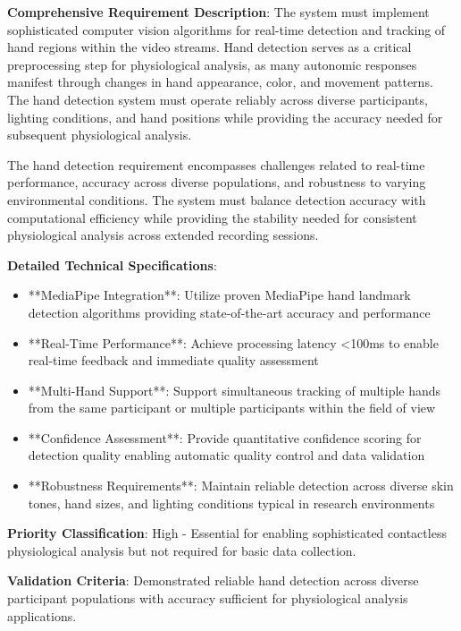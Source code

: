 \documentclass[11pt,a4paper]{report}
\begin{document}
\textbf{Comprehensive Requirement Description}: The system must implement sophisticated computer vision algorithms for
real-time detection and tracking of hand regions within the video streams. Hand detection serves as a critical
preprocessing step for physiological analysis, as many autonomic responses manifest through changes in hand appearance,
color, and movement patterns. The hand detection system must operate reliably across diverse participants, lighting
conditions, and hand positions while providing the accuracy needed for subsequent physiological analysis.

The hand detection requirement encompasses challenges related to real-time performance, accuracy across diverse
populations, and robustness to varying environmental conditions. The system must balance detection accuracy with
computational efficiency while providing the stability needed for consistent physiological analysis across extended
recording sessions.

\textbf{Detailed Technical Specifications}:

\begin{itemize}
\item **MediaPipe Integration**: Utilize proven MediaPipe hand landmark detection algorithms providing state-of-the-art
  accuracy and performance
\item **Real-Time Performance**: Achieve processing latency <100ms to enable real-time feedback and immediate quality
  assessment
\item **Multi-Hand Support**: Support simultaneous tracking of multiple hands from the same participant or multiple
  participants within the field of view
\item **Confidence Assessment**: Provide quantitative confidence scoring for detection quality enabling automatic quality
  control and data validation
\item **Robustness Requirements**: Maintain reliable detection across diverse skin tones, hand sizes, and lighting
  conditions typical in research environments

\end{itemize}
\textbf{Priority Classification}: High - Essential for enabling sophisticated contactless physiological analysis but not
required for basic data collection.

\textbf{Validation Criteria}: Demonstrated reliable hand detection across diverse participant populations with accuracy
sufficient for physiological analysis applications.
\end{document}
